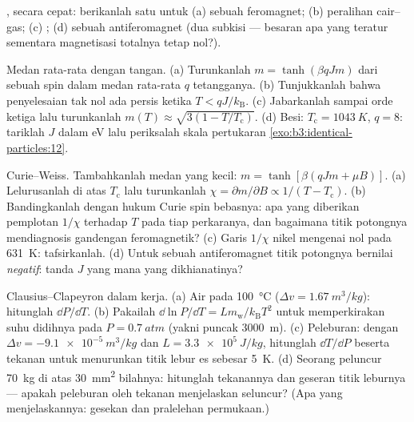 \begin{exercise}[$\star$]\label{exo:b3:phase-transitions:4}
, secara cepat: berikanlah satu untuk (a) sebuah
feromagnet; (b) peralihan cair--gas; (c) ; (d)
sebuah antiferomagnet (dua subkisi --- besaran apa yang teratur sementara
magnetisasi totalnya tetap nol?).
\end{exercise}

\begin{exercise}[$\star\star$]\label{exo:b3:phase-transitions:5}
Medan rata-rata dengan tangan. (a) Turunkanlah $m = \tanh(\beta qJm)$
dari sebuah spin dalam medan rata-rata $q$ tetangganya. (b) Tunjukkanlah
bahwa penyelesaian tak nol ada persis ketika $T < qJ/k_{\text{B}}$. (c)
Jabarkanlah sampai orde ketiga lalu turunkanlah $m(T) \approx \sqrt{3(1 -
T/T_{\text{c}})}$. (d) Besi: $T_{\text{c}} = \qty{1043}{K}$, $q =
8$: tariklah $J$ dalam eV lalu periksalah skala pertukaran
\cref{exo:b3:identical-particles:12}.
\end{exercise}

\begin{exercise}[$\star\star$]\label{exo:b3:phase-transitions:6}
Curie--Weiss. Tambahkanlah medan yang kecil: $m = \tanh[\beta(qJm + \mu B)]$.
(a) Lelurusanlah di atas $T_{\text{c}}$ lalu turunkanlah $\chi = \partial
m/\partial B \propto 1/(T - T_{\text{c}})$. (b) Bandingkanlah dengan
hukum Curie spin bebasnya: apa yang diberikan pemplotan $1/\chi$ terhadap $T$
pada tiap perkaranya, dan bagaimana titik potongnya mendiagnosis gandengan
feromagnetik? (c) Garis $1/\chi$ nikel mengenai nol pada \qty{631}{K}:
tafsirkanlah. (d) Untuk sebuah antiferomagnet titik potongnya bernilai
\emph{negatif}: tanda $J$ yang mana yang dikhianatinya?
\end{exercise}

\begin{exercise}[$\star\star$]\label{exo:b3:phase-transitions:7}
Clausius--Clapeyron dalam kerja. (a) Air pada \qty{100}{\celsius}
($\Delta v = \qty{1.67}{m^3/kg}$): hitunglah $\dd P/\dd T$. (b)
Pakailah $\dd\ln P/\dd T = Lm_{\text{w}}/k_{\text{B}}T^2$ untuk
memperkirakan suhu didihnya pada $P = \qty{0.7}{atm}$ (yakni puncak
\qty{3000}{m}). (c) Peleburan: dengan $\Delta v = \qty{-9.1e-5}{m^3/kg}$ dan
$L = \qty{3.3e5}{J/kg}$, hitunglah $\dd T/\dd P$ beserta tekanan
untuk menurunkan titik lebur es sebesar \qty{5}{K}. (d) Seorang
peluncur \qty{70}{kg} di atas \qty{30}{mm^2} bilahnya: hitunglah tekanannya dan
geseran titik leburnya --- apakah peleburan oleh tekanan menjelaskan
seluncur? (Apa yang menjelaskannya: gesekan dan pralelehan permukaan.)
\end{exercise}

